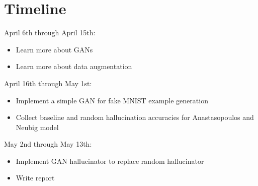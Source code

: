 \documentclass{article}
\begin{document}
  \section{Timeline}
    April 6th through April 15th:
    \begin{itemize}
      \item{Learn more about GANs}
      \item{Learn more about data augmentation}
    \end{itemize}
    April 16th through May 1st:
    \begin{itemize}
      \item{Implement a simple GAN for fake MNIST example generation}
      \item{Collect baseline and random hallucination accuracies for Anastasopoulos and Neubig model}
    \end{itemize}
    May 2nd through May 13th:
    \begin{itemize}
      \item{Implement GAN hallucinator to replace random hallucinator}
      \item{Write report}
    \end{itemize}
  
\end{document}
